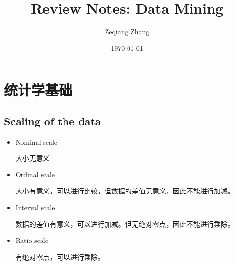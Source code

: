 \documentclass[12pt, a4paper, oneside]{ctexart}
\title{\textbf{Review Notes: Data Mining}}
\author{Zeqiang Zhang}
\date{\today}
\begin{document}
\maketitle

\newpage
\tableofcontents
\newpage
\section{统计学基础}
\subsection{Scaling of the data}
\begin{itemize}
    \item Nominal scale
    
    大小无意义
    \item Ordinal scale
    
    大小有意义，可以进行比较，但数据的差值无意义，因此不能进行加减。
    \item Interval scale
    
    数据的差值有意义，可以进行加减。但无绝对零点，因此不能进行乘除。
    \item Ratio scale
    
    有绝对零点，可以进行乘除。
\end{itemize}
\end{document}
